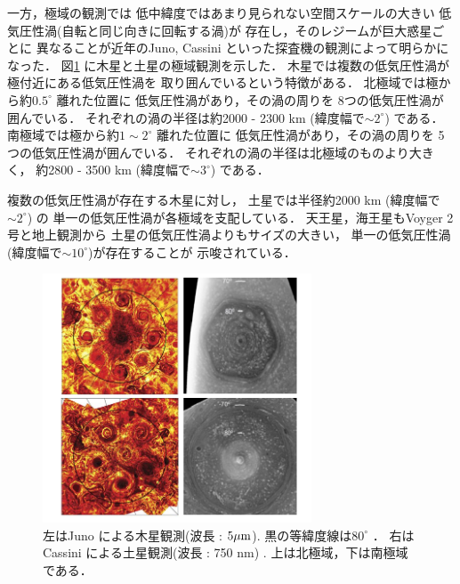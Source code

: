 \documentclass[a4j,12pt,openbib,oneside]{jreport}
\begin{document}
\clearpage
%
一方，極域の観測では
低中緯度ではあまり見られない空間スケールの大きい
低気圧性渦(自転と同じ向きに回転する渦)が
存在し，そのレジームが巨大惑星ごとに
異なることが近年のJuno, Cassini といった探査機の観測によって明らかになった．
%
図\ref{fig2} に木星と土星の極域観測を示した．
木星では複数の低気圧性渦が極付近にある低気圧性渦を
取り囲んでいるという特徴がある．
%
北極域では極から約$0.5^\circ$ 離れた位置に
低気圧性渦があり，その渦の周りを
8つの低気圧性渦が囲んでいる．
それぞれの渦の半径は約2000 - 2300 km (緯度幅で$\sim 2^\circ$) である．
%
南極域では極から約$1 \sim 2 ^\circ$ 離れた位置に
低気圧性渦があり，その渦の周りを
5つの低気圧性渦が囲んでいる．
それぞれの渦の半径は北極域のものより大きく，
約2800 - 3500 km (緯度幅で$\sim 3^\circ$) である\citep{Adriani2018}．

複数の低気圧性渦が存在する木星に対し，
土星では半径約2000 km (緯度幅で$\sim 2^\circ$) の
単一の低気圧性渦が各極域を支配している．
%
天王星，海王星もVoyger 2号と地上観測から
土星の低気圧性渦よりもサイズの大きい，
単一の低気圧性渦(緯度幅で$\sim 10^\circ$)が存在することが
示唆されている．
%
\begin{figure}[t]
  \begin{center}
    \includegraphics[clip,width=8cm]{./fig/intro/fig2.png}
    \caption{
      \footnotesize{左はJuno による木星観測(波長 : $5 \rm{\mu m}$).
黒の等緯度線は$80^\circ$ \citep{Adriani2018}．
右はCassini による土星観測(波長 : 750 nm) \citep{Antuano2015}.
上は北極域，下は南極域である．
      }
    }
    \label{fig2}
  \end{center}
\end{figure}
%
%
\end{document}
